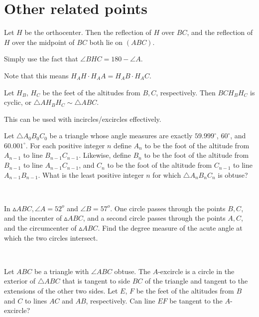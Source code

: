 \documentclass[mast]{lucky}
\begin{document}
\section{Other related points}
\begin{theo}
Let $H$ be the orthocenter. Then the reflection of $H$ over $BC$, and the reflection of $H$ over the midpoint of $BC$ both lie on $(ABC)$.
\end{theo}
\begin{pro}
Simply use the fact that $\angle BHC = 180 - \angle A$.
\end{pro}
Note that this means $H_AH\cdot H_AA = H_AB\cdot H_AC$.
\begin{theo}
Let $H_B$, $H_C$ be the feet of the altitudes from $B, C$, respectively. Then $BCH_BH_C$ is cyclic, or $\triangle AH_BH_C \sim \triangle ABC$.\\
\end{theo}
This can be used with incircles/excircles effectively.\\
\problems
{}
\begin{prob}[AMC 12A 2019/25]{3}
Let $\triangle A_0B_0C_0$ be a triangle whose angle measures are exactly $59.999^\circ$, $60^\circ$, and $60.001^\circ$. For each positive integer $n$ define $A_n$ to be the foot of the altitude from $A_{n-1}$ to line $B_{n-1}C_{n-1}$. Likewise, define $B_n$ to be the foot of the altitude from $B_{n-1}$ to line $A_{n-1}C_{n-1}$, and $C_n$ to be the foot of the altitude from $C_{n-1}$ to line $A_{n-1}B_{n-1}$. What is the least positive integer $n$ for which $\triangle A_nB_nC_n$ is obtuse?
\end{prob}\\
\begin{prob}{3}
In $\vartriangle ABC, \angle A = 52^o$ and $\angle B = 57^o$. One circle passes through the points $B, C$, and the incenter of $\vartriangle ABC$, and a second circle passes through the points $A, C$, and the circumcenter of $\vartriangle ABC$. Find the degree measure of the acute angle at which the two circles intersect.
\end{prob}\\
\begin{prob}[JMO 2019/4]{4}
Let $ABC$ be a triangle with $\angle ABC$ obtuse. The $A$-excircle is a circle in the exterior of $\triangle ABC$ that is tangent to side $BC$ of the triangle and tangent to the extensions of the other two sides. Let $E$, $F$ be the feet of the altitudes from $B$ and $C$ to lines $AC$ and $AB$, respectively. Can line $EF$ be tangent to the $A$-excircle?
\end{prob}\\
\end{document}
